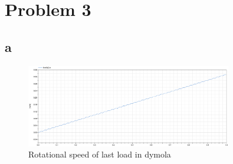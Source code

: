 \documentclass[11pt]{article}
\begin{document}
\section*{Problem 3}
\subsection*{a}
\begin{figure}[H]
\centering
\includegraphics[width=0.8\textwidth]{DymolaRotationalSpeed.eps}
\caption{Rotational speed of last load in dymola}
\end{figure}
\end{document}
